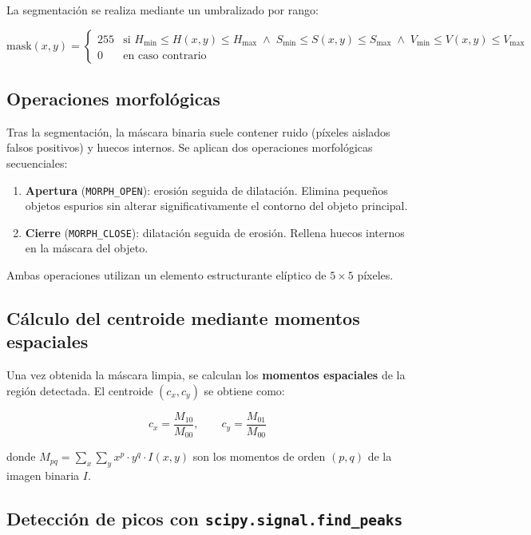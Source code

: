 \documentclass[12pt,a4paper]{article}
\begin{document}
La segmentación se realiza mediante un umbralizado por rango:

\begin{equation}
    \text{mask}(x, y) =
    \begin{cases}
        255 & \text{si } H_{\min} \leq H(x,y) \leq H_{\max} \;\land\; S_{\min} \leq S(x,y) \leq S_{\max} \;\land\; V_{\min} \leq V(x,y) \leq V_{\max} \\
        0   & \text{en caso contrario}
    \end{cases}
\end{equation}

\subsection{Operaciones morfológicas}

Tras la segmentación, la máscara binaria suele contener ruido (píxeles aislados falsos positivos) y huecos internos. Se aplican dos operaciones morfológicas secuenciales:

\begin{enumerate}
    \item \textbf{Apertura} (\texttt{MORPH\_OPEN}): erosión seguida de dilatación. Elimina pequeños objetos espurios sin alterar significativamente el contorno del objeto principal.
    \item \textbf{Cierre} (\texttt{MORPH\_CLOSE}): dilatación seguida de erosión. Rellena huecos internos en la máscara del objeto.
\end{enumerate}

Ambas operaciones utilizan un elemento estructurante elíptico de $5 \times 5$ píxeles.

\subsection{Cálculo del centroide mediante momentos espaciales}

Una vez obtenida la máscara limpia, se calculan los \textbf{momentos espaciales} de la región detectada. El centroide $(c_x, c_y)$ se obtiene como:

\begin{equation}
    c_x = \frac{M_{10}}{M_{00}}, \qquad c_y = \frac{M_{01}}{M_{00}}
\end{equation}

donde $M_{pq} = \sum_x \sum_y x^p \cdot y^q \cdot I(x,y)$ son los momentos de orden $(p, q)$ de la imagen binaria $I$.

\subsection{Detección de picos con \texttt{scipy.signal.find\_peaks}}
\end{document}
